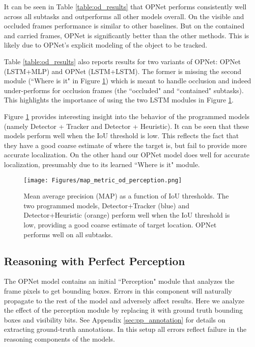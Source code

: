 \documentclass[]{llncs}
\newcommand{\figref}[1]{Figure \ref{#1}}
\begin{document}
It can be seen in Table \ref{table:od_results} that OPNet performs consistently well across all subtasks and outperforms all other models overall. On the visible and occluded frames performance is similar to other baselines. But on the contained and carried frames, OPNet is significantly better than the other methods. This is likely due to OPNet's explicit modeling of the object to be tracked.

Table \ref{table:od_results} also reports results for two variants of OPNet: OPNet (LSTM+MLP) and OPNet (LSTM+LSTM). The former is missing the second module (``Where is it" in \figref{fig:map_od}) which is meant to handle occlusion and indeed under-performs for occlusion frames (the ``occluded" and ``contained" subtasks). 
This highlights the importance of using the two LSTM modules in \figref{fig:map_od}.

\figref{fig:map_od} provides interesting insight into the behavior of the programmed models (namely Detector + Tracker and Detector + Heuristic). It can be seen that these models perform well when the IoU threshold is low. This reflects the fact that they have a good coarse estimate of where the target is, but fail to provide more accurate localization. On the other hand our OPNet model does well for accurate localization, presumably due to its learned ``Where is it" module.

\begin{figure}[!h]
\begin{center}
    \texttt{[image: Figures/map\_metric\_od\_perception.png]}
\caption{Mean average precision (MAP) as a function of IoU thresholds. The two programmed models, Detector+Tracker (blue) and Detector+Heuristic (orange) perform well when the IoU threshold is low, providing a good coarse estimate of target location. OPNet performs well on all subtasks.\label{fig:map_od}}
\end{center}
\end{figure}

\subsection{Reasoning with Perfect Perception} \label{sec:perfect_abl} 
The OPNet model contains an initial ``Perception" module that analyzes the frame pixels to get bounding boxes. Errors in this component will naturally propagate to the rest of the model and adversely affect results. Here we analyze the effect of the perception module by replacing it with ground truth bounding boxes and visibility bits. See Appendix \ref{sec:pp_annotation} for details on extracting ground-truth annotations. In this setup all errors reflect failure in the reasoning components of the models.
\end{document}
